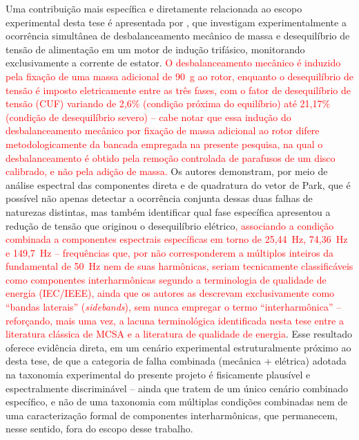 \documentclass[times,final]{elsarticle}
\begin{document}
Uma contribuição mais específica e diretamente relacionada ao escopo experimental desta tese é apresentada por \citet{benamira2022}, que investigam experimentalmente a ocorrência simultânea de desbalanceamento mecânico de massa e desequilíbrio de tensão de alimentação em um motor de indução trifásico, monitorando exclusivamente a corrente de estator. \textcolor{red}{O desbalanceamento mecânico é induzido pela fixação de uma massa adicional de 90~g ao rotor, enquanto o desequilíbrio de tensão é imposto eletricamente entre as três fases, com o fator de desequilíbrio de tensão (CUF) variando de 2,6\% (condição próxima do equilíbrio) até 21,17\% (condição de desequilíbrio severo) -- cabe notar que essa indução do desbalanceamento mecânico por fixação de massa adicional ao rotor difere metodologicamente da bancada empregada na presente pesquisa, na qual o desbalanceamento é obtido pela remoção controlada de parafusos de um disco calibrado, e não pela adição de massa.} Os autores demonstram, por meio de análise espectral das componentes direta e de quadratura do vetor de Park, que é possível não apenas detectar a ocorrência conjunta dessas duas falhas de naturezas distintas, mas também identificar qual fase específica apresentou a redução de tensão que originou o desequilíbrio elétrico\textcolor{red}{, associando a condição combinada a componentes espectrais específicas em torno de 25,44~Hz, 74,36~Hz e 149,7~Hz -- frequências que, por não corresponderem a múltiplos inteiros da fundamental de 50~Hz nem de suas harmônicas, seriam tecnicamente classificáveis como componentes interharmônicas segundo a terminologia de qualidade de energia (IEC/IEEE), ainda que os autores as descrevam exclusivamente como ``bandas laterais'' (\textit{sidebands}), sem nunca empregar o termo ``interharmônica'' -- reforçando, mais uma vez, a lacuna terminológica identificada nesta tese entre a literatura clássica de MCSA e a literatura de qualidade de energia}. Esse resultado oferece evidência direta, em um cenário experimental estruturalmente próximo ao desta tese, de que a categoria de falha combinada (mecânica + elétrica) adotada na taxonomia experimental do presente projeto é fisicamente plausível e espectralmente discriminável -- ainda que \citet{benamira2022} tratem de um único cenário combinado específico, e não de uma taxonomia com múltiplas condições combinadas nem de uma caracterização formal de componentes interharmônicas, que permanecem, nesse sentido, fora do escopo desse trabalho.
\end{document}
